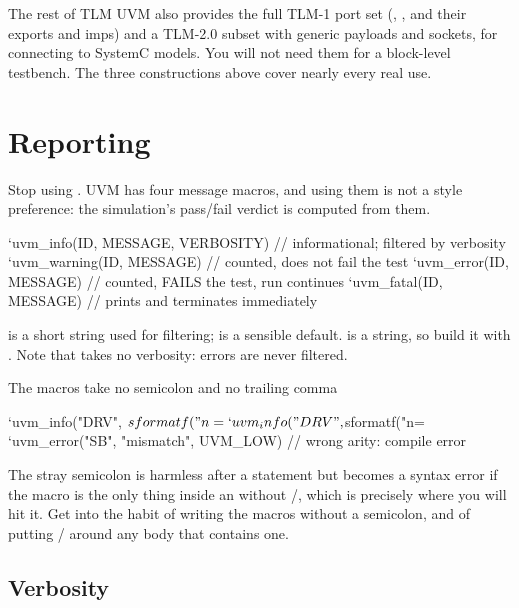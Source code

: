 \begin{notebox}{The rest of TLM}
UVM also provides the full TLM-1 port set (,
,  and their
exports and imps) and a TLM-2.0 subset with generic payloads and sockets, for
connecting to SystemC models. You will not need them for a block-level
testbench. The three constructions above cover nearly every real use.
\end{notebox}

\section{Reporting}
\label{sec:uvm:reporting}

Stop using . UVM has four message macros, and using them is
not a style preference: the simulation's pass/fail verdict is computed from
them.

\begin{uvmcode}
`uvm_info(ID, MESSAGE, VERBOSITY)   // informational; filtered by verbosity
`uvm_warning(ID, MESSAGE)           // counted, does not fail the test
`uvm_error(ID, MESSAGE)             // counted, FAILS the test, run continues
`uvm_fatal(ID, MESSAGE)             // prints and terminates immediately
\end{uvmcode}

 is a short string used for filtering;  is a
sensible default.  is a string, so build it with
. Note that  takes no verbosity: errors
are never filtered.

\begin{gotcha}{The macros take no semicolon and no trailing comma}
\begin{uvmcode}
`uvm_info("DRV", $sformatf("n=%
`uvm_info("DRV", $sformatf("n=%
`uvm_error("SB", "mismatch", UVM_LOW)                // wrong arity: compile error
\end{uvmcode}
The stray semicolon is harmless after a statement but becomes a syntax error
if the macro is the only thing inside an  without /,
which is precisely where you will hit it. Get into the habit of writing the
macros without a semicolon, and of putting / around any
 body that contains one.
\end{gotcha}

\subsection{Verbosity}

